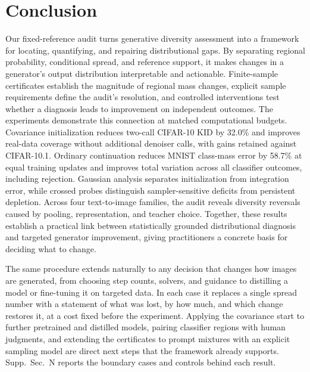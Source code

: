 \section{Conclusion}
\label{sec:conclusion}
Our fixed-reference audit turns generative diversity assessment into a framework for locating, quantifying, and repairing distributional gaps. By separating regional probability, conditional spread, and reference support, it makes changes in a generator’s output distribution interpretable and actionable. Finite-sample certificates establish the magnitude of regional mass changes, explicit sample requirements define the audit’s resolution, and controlled interventions test whether a diagnosis leads to improvement on independent outcomes. The experiments demonstrate this connection at matched computational budgets. Covariance initialization reduces two-call CIFAR-10 KID by 32.0\% and improves real-data coverage without additional denoiser calls, with gains retained against CIFAR-10.1. Ordinary continuation reduces MNIST class-mass error by 58.7\% at equal training updates and improves total variation across all classifier outcomes, including rejection. Gaussian analysis separates initialization from integration error, while crossed probes distinguish sampler-sensitive deficits from persistent depletion. Across four text-to-image families, the audit reveals diversity reversals caused by pooling, representation, and teacher choice. Together, these results establish a practical link between statistically grounded distributional diagnosis and targeted generator improvement, giving practitioners a concrete basis for deciding what to change.

The same procedure extends naturally to any decision that changes how
images are generated, from choosing step counts, solvers, and guidance to
distilling a model or fine-tuning it on targeted data. In each case it
replaces a single spread number with a statement of what was lost, by how
much, and which change restores it, at a cost fixed before the experiment.
Applying the covariance start to further pretrained and distilled models,
pairing classifier regions with human judgments, and extending the
certificates to prompt mixtures with an explicit sampling model are direct
next steps that the framework already supports. Supp.~Sec.~N reports the
boundary cases and controls behind each result.
